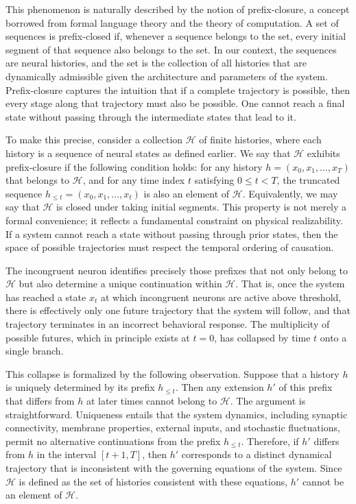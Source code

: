 \documentclass[11pt]{article}
\newcommand{\histories}{\mathcal{H}}
\begin{document}
This phenomenon is naturally described by the notion of prefix-closure, a concept borrowed from formal language theory and the theory of computation. A set of sequences is prefix-closed if, whenever a sequence belongs to the set, every initial segment of that sequence also belongs to the set. In our context, the sequences are neural histories, and the set is the collection of all histories that are dynamically admissible given the architecture and parameters of the system. Prefix-closure captures the intuition that if a complete trajectory is possible, then every stage along that trajectory must also be possible. One cannot reach a final state without passing through the intermediate states that lead to it.

To make this precise, consider a collection $\histories$ of finite histories, where each history is a sequence of neural states as defined earlier. We say that $\histories$ exhibits prefix-closure if the following condition holds: for any history $h = (x_0, x_1, \ldots, x_T)$ that belongs to $\histories$, and for any time index $t$ satisfying $0 \le t < T$, the truncated sequence $h_{\le t} = (x_0, x_1, \ldots, x_t)$ is also an element of $\histories$. Equivalently, we may say that $\histories$ is closed under taking initial segments. This property is not merely a formal convenience; it reflects a fundamental constraint on physical realizability. If a system cannot reach a state without passing through prior states, then the space of possible trajectories must respect the temporal ordering of causation.

The incongruent neuron identifies precisely those prefixes that not only belong to $\histories$ but also determine a unique continuation within $\histories$. That is, once the system has reached a state $x_t$ at which incongruent neurons are active above threshold, there is effectively only one future trajectory that the system will follow, and that trajectory terminates in an incorrect behavioral response. The multiplicity of possible futures, which in principle exists at $t=0$, has collapsed by time $t$ onto a single branch.

This collapse is formalized by the following observation. Suppose that a history $h$ is uniquely determined by its prefix $h_{\le t}$. Then any extension $h'$ of this prefix that differs from $h$ at later times cannot belong to $\histories$. The argument is straightforward. Uniqueness entails that the system dynamics, including synaptic connectivity, membrane properties, external inputs, and stochastic fluctuations, permit no alternative continuations from the prefix $h_{\le t}$. Therefore, if $h'$ differs from $h$ in the interval $[t+1, T]$, then $h'$ corresponds to a distinct dynamical trajectory that is inconsistent with the governing equations of the system. Since $\histories$ is defined as the set of histories consistent with these equations, $h'$ cannot be an element of $\histories$.
\end{document}
